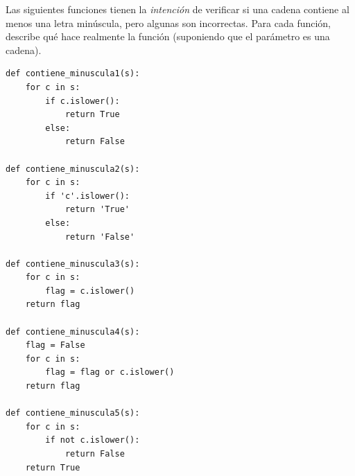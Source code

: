 \documentclass[10pt]{book}
\begin{document}
\begin{exercise}

Las siguientes funciones tienen la {\em intención} de verificar si una
cadena contiene al menos una letra minúscula, pero algunas son
incorrectas.  Para cada función, describe qué hace realmente la función
(suponiendo que el parámetro es una cadena).

\begin{verbatim}
def contiene_minuscula1(s):
    for c in s:
        if c.islower():
            return True
        else:
            return False

def contiene_minuscula2(s):
    for c in s:
        if 'c'.islower():
            return 'True'
        else:
            return 'False'

def contiene_minuscula3(s):
    for c in s:
        flag = c.islower()
    return flag

def contiene_minuscula4(s):
    flag = False
    for c in s:
        flag = flag or c.islower()
    return flag

def contiene_minuscula5(s):
    for c in s:
        if not c.islower():
            return False
    return True
\end{verbatim}

\end{exercise}
\end{document}

